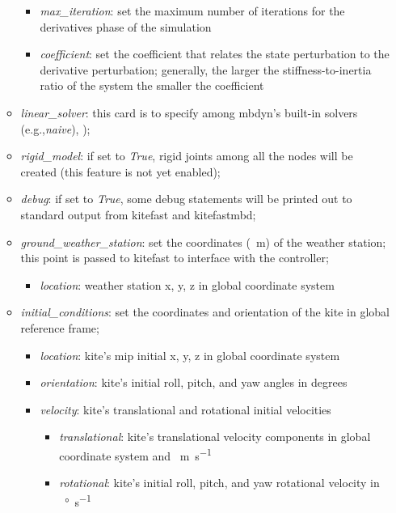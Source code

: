 \documentclass[report]{nrel}
\def\eg{e.g., }
\def\eg{e.g.,}
\begin{document}
\begin{itemize}
\begin{itemize}
\begin{itemize}
			\item \emph{max\_iteration}: set the maximum number of iterations for the derivatives phase of the simulation
			\item \emph{coefficient}: set the coefficient that relates the state perturbation to the derivative perturbation; generally, the larger the stiffness-to-inertia ratio of the system the smaller the coefficient
		\end{itemize}
		\item \emph{linear\_solver}: this card is to specify among \gls{mbdyn}'s built-in solvers (\eg \emph{naive}), \citep[see][]{masarati2017});
		\item \emph{rigid\_model}: if set to \emph{True}, rigid joints among all the nodes will be created (this feature is not yet enabled);
%
		\item \emph{debug}: if set to \emph{True}, some debug statements will be printed out to standard output from  \gls{kitefast} and \gls{kitefastmbd};
%
		\item \emph{ground\_weather\_station}: set the coordinates (\SI{}{\m}) of the weather station; this point is passed to \gls{kitefast} to interface with the controller;
			\begin{itemize}
				\item \emph{location}: weather station x, y, z in global coordinate system 
			\end{itemize}
%
		\item \emph{initial\_conditions}: set the coordinates and orientation of the kite in global reference frame;
			\begin{itemize}
				\item \emph{location}: kite's \gls{mip} initial x, y, z in global coordinate system 
				\item \emph{orientation}: kite's initial roll, pitch, and yaw angles in degrees
				\item \emph{velocity}: kite's translational and rotational initial velocities
				\begin{itemize}
					\item \emph{translational}: kite's translational velocity components in global coordinate system and \SI{}{\m\per\s}
					\item \emph{rotational}: kite's initial roll, pitch, and yaw rotational velocity in \SI{}{\degree \per \s}
				\end{itemize}
			\end{itemize}
%		
	\end{itemize} %

\end{itemize}
\end{document}

